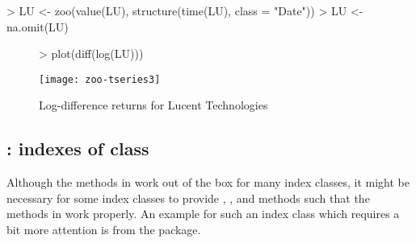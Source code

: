 \documentclass{Z}
\begin{document}
\begin{Schunk}
\begin{Sinput}
> LU <- zoo(value(LU), structure(time(LU), class = "Date"))
> LU <- na.omit(LU)
\end{Sinput}
\end{Schunk}

\begin{figure}
\begin{center}
\begin{Schunk}
\begin{Sinput}
> plot(diff(log(LU)))
\end{Sinput}
\end{Schunk}
\texttt{[image: zoo-tseries3]}
\caption{\label{fig:tseries} Log-difference returns for Lucent Technologies}
\end{center}
\end{figure}


\subsection[fBasics: indexes of class "timeDate"]{: indexes of class }

Although the methods in  work out of the box for many index classes,
it might be necessary for some index classes to provide , ,
 and  methods such that the methods in  
work properly. An example for such an index class which requires a bit more
attention is  from the  package.
\end{document}
